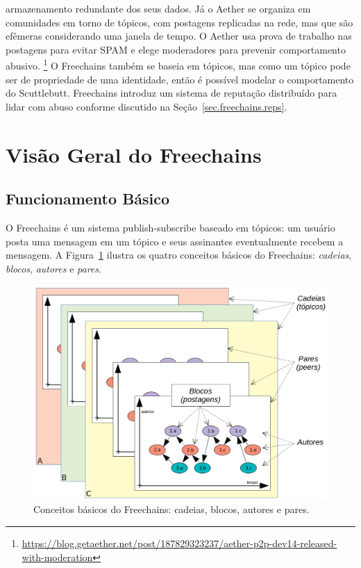 \documentclass[12pt]{article}
\newcommand{\FC} {Freechains\xspace}
\begin{document}
armazenamento redundante dos seus dados.
Já o Aether se organiza em comunidades em torno de tópicos, com postagens
replicadas na rede, mas que são efêmeras considerando uma janela de tempo.
O Aether usa prova de trabalho nas postagens para evitar SPAM e elege
moderadores para prevenir comportamento abusivo.%
\footnote{\url{https://blog.getaether.net/post/187829323237/aether-p2p-dev14-released-with-moderation}}
%
O \FC também se baseia em tópicos, mas como um tópico pode ser de propriedade
de uma identidade, então é possível modelar o comportamento do Scuttlebutt.
\FC introduz um sistema de reputação distribuído para lidar com abuso conforme
discutido na Seção~\ref{sec.freechains.reps}.

\section{Visão Geral do \FC}
\label{sec.freechains}

\subsection{Funcionamento Básico}

O \FC é um sistema publish-subscribe baseado em tópicos: um usuário
posta uma mensagem em um tópico e seus assinantes eventualmente recebem a
mensagem.
A Figura~\ref{fig.all} ilustra os quatro conceitos básicos do \FC:
\emph{cadeias}, \emph{blocos}, \emph{autores} e \emph{pares}.

\begin{figure}[ht]
\centering
\includegraphics[width=.60\textwidth]{all1.png}
\caption{\scriptsize{Conceitos básicos do \FC: cadeias, blocos, autores e pares.}}
\label{fig.all}
\end{figure}
\end{document}
